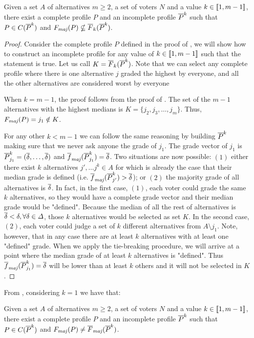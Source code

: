 	\begin{theorem}
		\label{th:uncompleteK}
		Given a set $A$ of alternatives $m\geq 2$, a set of voters $N$ and a value $k\in \llbracket1,m-1\rrbracket$, there exist a complete profile $P$ and an incomplete profile $\overline{P}^k$ such that $P \in C(\overline{P}^k)$ and $\Fmaj(P) \nsubseteq \overline{F}_k(\Pbar^k)$.
	\end{theorem}
	\begin{proof}
		Consider the complete profile $P$ defined in the proof of , we will show how to construct an incomplete profile for any value of $k\in \llbracket1,m-1\rrbracket$ such that the statement is true. Let us call $K=\overline{F}_k(\overline{P}^k)$.
		Note that we can select any complete profile where there is one alternative $j$ graded the highest by everyone, and all the other alternatives are considered worst by everyone
		
		When $k=m-1$, the proof follows from the proof of . The set of the $m-1$ alternatives with the highest medians is $K=\{j_2,j_3,\dots,j_m\}$. Thus, $\Fmaj(P)=j_1 \notin K$.
		
		For any other $k<m-1$ we can follow the same reasoning by building $\overline{P}^k$ making sure that we never ask anyone the grade of $j_1$. 
		The grade vector of $j_1$ is $\overline{P}^k_{j_1}=(\overline{\delta}, \dots, \overline{\delta})$ and $\fmajbar(\Pbar^k_{j_1})=\dbar$.
		Two situations are now possible: $(1)$ either there exist $k$ alternatives $j',\dots j^k\in A$ for which is already the case that their median grade is defined (i.e. $\fmajbar(\Pbar^k_{j'})>\dbar$); or $(2)$ the majority grade of all alternatives is $\overline{\delta}$. 
		In fact, in the first case, $(1)$, each voter could grade the same $k$ alternatives, so they would have a complete grade vector and their median grade would be "defined". Because the median of all the rest of alternatives is $\overline{\delta} < \delta, \forall \delta \in \Delta$, those $k$ alternatives would be selected as set $K$.
		In the second case, $(2)$, each voter could judge a set of $k$ different alternatives from $A\setminus j_1$. Note, however, that in any case there are at least $k$ alternatives with at least one "defined" grade. When we apply the tie-breaking procedure, we will arrive at a point where the median grade of at least $k$ alternatives is "defined". Thus $\fmajbar(\Pbar^k_{j_1})=\dbar$ will be lower than at least $k$ others and it will not be selected in $K$.
	\end{proof}	
	
	From , considering $k=1$ we have that:
	\begin{remark}
		Given a set $A$ of alternatives $m\geq 2$, a set of voters $N$ and a value $k\in \llbracket1,m-1\rrbracket$, there exist a complete profile $P$ and an incomplete profile $\overline{P}^k$ such that $P \in C(\overline{P}^k)$ and $\Fmaj(P) \neq \Fmajbar(\Pbar^k)$.
	\end{remark}


